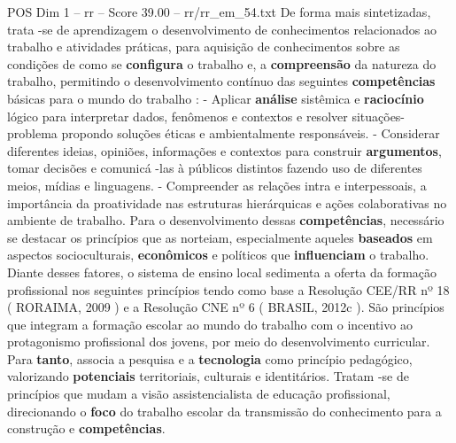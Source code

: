 \begin{textsample}{POS Dim 1 – rr – Score 39.00 – rr/rr\_em\_54.txt}
De forma mais sintetizadas, trata -se de aprendizagem o desenvolvimento de conhecimentos relacionados ao trabalho e atividades práticas, para aquisição de conhecimentos sobre as condições de como se \textbf{configura} o trabalho e, a \textbf{compreensão} da natureza do trabalho, permitindo o desenvolvimento contínuo das seguintes \textbf{competências} básicas para o mundo do trabalho : - Aplicar \textbf{análise} sistêmica e \textbf{raciocínio} lógico para interpretar dados, fenômenos e contextos e resolver situações-problema propondo soluções éticas e ambientalmente responsáveis. - Considerar diferentes ideias, opiniões, informações e contextos para construir \textbf{argumentos}, tomar decisões e comunicá -las à públicos distintos fazendo uso de diferentes meios, mídias e linguagens. - Compreender as relações intra e interpessoais, a importância da proatividade nas estruturas hierárquicas e ações colaborativas no ambiente de trabalho.
Para o desenvolvimento dessas \textbf{competências}, necessário se destacar os princípios que as norteiam, especialmente aqueles \textbf{baseados} em aspectos socioculturais, \textbf{econômicos} e políticos que \textbf{influenciam} o trabalho.
Diante desses fatores, o sistema de ensino local sedimenta a oferta da formação profissional nos seguintes princípios tendo como base a Resolução CEE/RR nº 18 ( RORAIMA, 2009 ) e a Resolução CNE nº 6 ( BRASIL, 2012c ).
São princípios que integram a formação escolar ao mundo do trabalho com o incentivo ao protagonismo profissional dos jovens, por meio do desenvolvimento curricular.
Para \textbf{tanto}, associa a pesquisa e a \textbf{tecnologia} como princípio pedagógico, valorizando \textbf{potenciais} territoriais, culturais e identitários.
Tratam -se de princípios que mudam a visão assistencialista de educação profissional, direcionando o \textbf{foco} do trabalho escolar da transmissão do conhecimento para a construção e \textbf{competências}.

\end{textsample}
